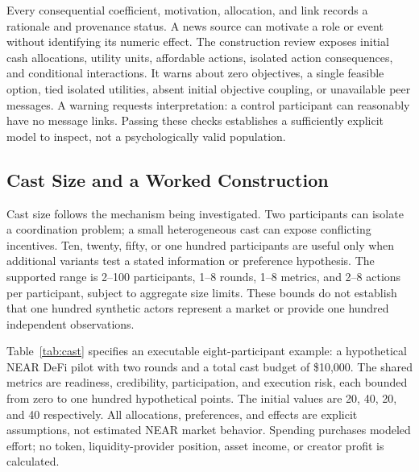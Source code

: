 Every consequential coefficient, motivation, allocation, and link records a
rationale and provenance status. A news source can motivate a role or event
without identifying its numeric effect. The construction review exposes
initial cash allocations, utility units, affordable actions, isolated action
consequences, and conditional interactions. It warns about zero objectives,
a single feasible option, tied isolated utilities, absent initial objective
coupling, or unavailable peer messages. A warning requests interpretation:
a control participant can reasonably have no message links. Passing these
checks establishes a sufficiently explicit model to inspect, not a
psychologically valid population.

\subsection{Cast Size and a Worked Construction}\label{sec:cast}
Cast size follows the mechanism being investigated. Two participants can
isolate a coordination problem; a small heterogeneous cast can expose
conflicting incentives. Ten, twenty, fifty, or one hundred participants are
useful only when additional variants test a stated information or preference
hypothesis. The supported range is 2--100 participants, 1--8 rounds, 1--8
metrics, and 2--8 actions per participant, subject to aggregate size limits.
These bounds do not establish that one hundred synthetic actors represent a
market or provide one hundred independent observations.

Table~\ref{tab:cast} specifies an executable eight-participant example: a
hypothetical NEAR DeFi pilot with two rounds and a total cast budget of
\$10,000. The shared metrics are readiness, credibility, participation, and
execution risk, each bounded from zero to one hundred hypothetical points.
The initial values are 20, 40, 20, and 40 respectively. All allocations,
preferences, and effects are explicit assumptions, not estimated NEAR market
behavior. Spending purchases modeled effort; no token, liquidity-provider
position, asset income, or creator profit is calculated.

